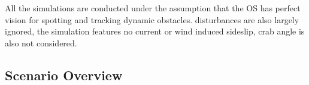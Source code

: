 All the simulations are conducted under the assumption that the \gls{OS} has perfect vision for spotting and tracking dynamic obstacles.
disturbances are also largely ignored, the simulation features no current or wind induced sideslip, crab angle is also not considered.

\subsection{Scenario Overview}





